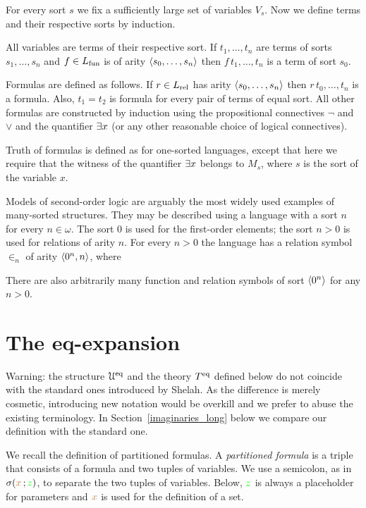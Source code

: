 \documentclass[creche.tex]{subfiles}
\begin{document}
For every sort $s$ we fix a sufficiently large set of variables $V_s$. Now we define terms and their respective sorts by induction.

All variables are terms of their respective sort. If $t_1,\dots,t_n$ are terms of sorts $s_1,\dots,s_n$ and $f\in L_{\rm fun}$ is of arity $\langle s_0,\dots,s_n\rangle$ then $f\,t_1,\dots,t_n$ is a term of sort $s_0$. 

Formulas are defined as follows. If $r\in L_{\rm rel}$ has arity $\langle s_0,\dots,s_n\rangle$ then $r\,t_0,\dots,t_n$ is a formula. Also, $t_1=t_2$ is formula for every pair of terms of equal sort. All other formulas are constructed by induction using the propositional connectives $\neg$ and $\vee$ and the quantifier $\exists x$ (or any other reasonable choice of logical connectives).

Truth of formulas is defined as for one-sorted languages, except that here we require that the witness of the quantifier $\exists x$ belongs to $M_s$, where $s$ is the sort of the variable $x$.

Models of second-order logic are arguably the most widely used examples of many-sorted structures. They may be described using a language with a sort $n$ for every $n\in\omega$. The sort $0$ is used for the first-order elements; the sort $n>0$ is used for relations of arity $n$. For every $n>0$ the language has a relation symbol $\in_n$ of arity $\langle0^n,n\rangle$, where 


There are also arbitrarily many function and relation symbols of sort $\langle0^n\rangle$ for any $n>0$.

\section{The eq-expansion}\label{immaginari}

\noindent\llap{\textcolor{red}{\Large\danger}\kern1.5ex}Warning: the structure $\EuScript U^{{\rm eq}}$ and the theory $T^{{\rm eq}}$ defined below do not coincide with the standard ones introduced by Shelah. As the difference is merely cosmetic, introducing new notation would be overkill and we prefer to abuse the existing terminology. In Section~\ref{imaginaries_long} below we compare our definition with the standard one. %

We recall the definition of partitioned formulas. A \emph{partitioned formula\/} is a triple that consists of a formula and two tuples of variables. We use a semicolon, as in $\sigma({\color{brown} x}\,;{\color{green} z})$, to separate the two tuples of variables. Below, ${\color{green} z}$ is always a placeholder for parameters and ${\color{brown} x}$ is used for the definition of a set.
\end{document}
